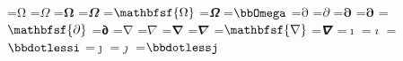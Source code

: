 \documentclass{article}
\begin{document}
=\hbox{$\mathrm{\Omega}$}
=\hbox{$\mathit{\Omega}$}
=\hbox{$\mathbf{\Omega}$}
=\hbox{$\mathbfit{\Omega}$}
=\hbox{$\mathbfsf{\Omega}$}
=\hbox{$\mathbfsfit{\Omega}$}
=\hbox{$\bbOmega $}
=\hbox{$\mathrm{\partial}$}
=\hbox{$\mathit{\partial}$}
=\hbox{$\mathbf{\partial}$}
=\hbox{$\mathbfup{\partial}$}
=\hbox{$\mathbfsf{\partial}$}
=\hbox{$\mathbfsfup{\partial}$}
=\hbox{$\mathrm{\nabla}$}
=\hbox{$\mathit{\nabla}$}
=\hbox{$\mathbf{\nabla}$}
=\hbox{$\mathbfit{\nabla}$}
=\hbox{$\mathbfsf{\nabla}$}
=\hbox{$\mathbfsfit{\nabla}$}
=\hbox{$\mathrm{\imath}$}
=\hbox{$\mathit{\imath}$}
=\hbox{$\bbdotlessi $}
=\hbox{$\mathrm{\jmath}$}
=\hbox{$\mathit{\jmath}$}
=\hbox{$\bbdotlessj $}
\end{document}
